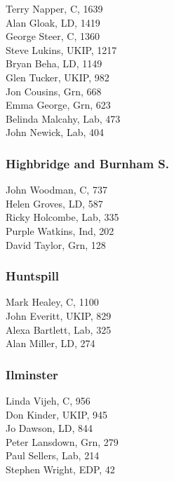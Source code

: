 \documentclass[a4paper,openany,10pt]{book}
\begin{document}


Terry Napper, C, 1639\\
Alan Gloak, LD, 1419\\
George Steer, C, 1360\\
Steve Lukins, UKIP, 1217\\
Bryan Beha, LD, 1149\\
Glen Tucker, UKIP, 982\\
Jon Cousins, Grn, 668\\
Emma George, Grn, 623\\
Belinda Malcahy, Lab, 473\\
John Newick, Lab, 404\\


\subsubsection*{Highbridge and Burnham S.}



John Woodman, C, 737\\
Helen Groves, LD, 587\\
Ricky Holcombe, Lab, 335\\
Purple Watkins, Ind, 202\\
David Taylor, Grn, 128\\


\subsubsection*{Huntspill}



Mark Healey, C, 1100\\
John Everitt, UKIP, 829\\
Alexa Bartlett, Lab, 325\\
Alan Miller, LD, 274\\


\subsubsection*{Ilminster}



Linda Vijeh, C, 956\\
Don Kinder, UKIP, 945\\
Jo Dawson, LD, 844\\
Peter Lansdown, Grn, 279\\
Paul Sellers, Lab, 214\\
Stephen Wright, EDP, 42\\
\end{document}
